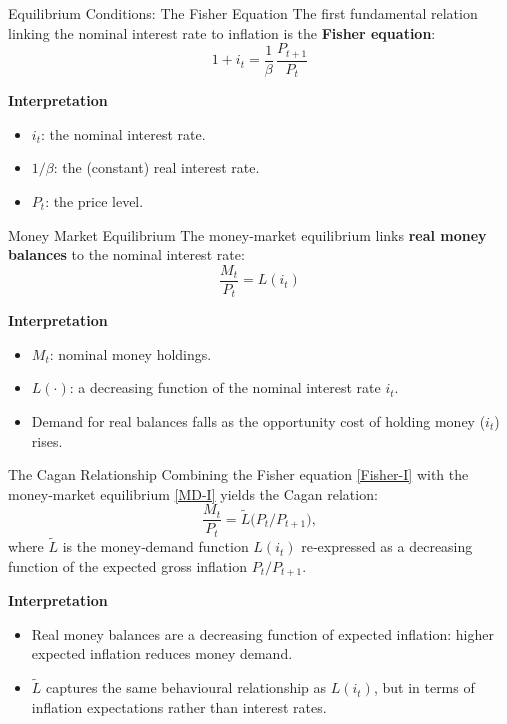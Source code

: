 \documentclass[11pt,aspectratio=169]{beamer}
\begin{document}
\begin{frame}{Equilibrium Conditions: The Fisher Equation}
\small
The first fundamental relation linking the nominal interest rate to inflation is the \textbf{Fisher equation}:
\begin{equation}
1 + i_{t} = \frac{1}{\beta}\,\frac{P_{t+1}}{P_{t}}
\label{Fisher-I}
\end{equation}

\textbf{Interpretation}
\begin{itemize}
    \item $i_t$: the nominal interest rate.
    \item $1/\beta$: the (constant) real interest rate.
    \item $P_t$: the price level.
\end{itemize}
\end{frame}

\begin{frame}{Money Market Equilibrium}
\small
The money‑market equilibrium links \textbf{real money balances} to the nominal interest rate:
\begin{equation}
\frac{M_{t}}{P_{t}} = L(i_t)
\label{MD-I}
\end{equation}

\textbf{Interpretation}
\begin{itemize}
    \item $M_t$: nominal money holdings.
    \item $L(\cdot)$: a decreasing function of the nominal interest rate $i_t$.
    \item Demand for real balances falls as the opportunity cost of holding money ($i_t$) rises.
\end{itemize}
\end{frame}

\begin{frame}{The Cagan Relationship}
\small
Combining the Fisher equation \eqref{Fisher-I} with the money‑market equilibrium \eqref{MD-I} yields the Cagan relation:
\[
\frac{M_t}{P_t} = \tilde{L}\!\bigl(P_t/P_{t+1}\bigr),
\]
where \(\tilde{L}\) is the money‑demand function \(L(i_t)\) re‑expressed as a decreasing function of the expected gross inflation \(P_t/P_{t+1}\).

\vspace{0.2cm}

\textbf{Interpretation}
\begin{itemize}
    \item Real money balances are a decreasing function of expected inflation: higher expected inflation reduces money demand.
    \item \(\tilde{L}\) captures the same behavioural relationship as \(L(i_t)\), but in terms of inflation expectations rather than interest rates.
\end{itemize}
\end{frame}
\end{document}
